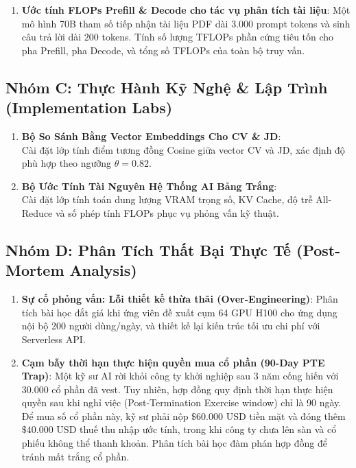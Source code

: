 \begin{enumerate}[label=\textbf{B\arabic*.}]
  \item \textbf{Ước tính FLOPs Prefill \& Decode cho tác vụ phân tích tài liệu}:
  Một mô hình 70B tham số tiếp nhận tài liệu PDF dài $3.000$ prompt tokens và sinh câu trả lời dài $200$ tokens.
  Tính số lượng TFLOPs phần cứng tiêu tốn cho pha Prefill, pha Decode, và tổng số TFLOPs của toàn bộ truy vấn.
\end{enumerate}

\subsection{Nhóm C: Thực Hành Kỹ Nghệ \& Lập Trình (Implementation Labs)}

\begin{enumerate}[label=\textbf{C\arabic*.}]
  \item \textbf{Bộ So Sánh Bằng Vector Embeddings Cho CV \& JD}: \\
  Cài đặt lớp  tính điểm tương đồng Cosine giữa vector CV và JD, xác định độ phù hợp theo ngưỡng $\theta = 0.82$.
  \item \textbf{Bộ Ước Tính Tài Nguyên Hệ Thống AI Bảng Trắng}: \\
  Cài đặt lớp  tính toán dung lượng VRAM trọng số, KV Cache, độ trễ All-Reduce và số phép tính FLOPs phục vụ phỏng vấn kỹ thuật.
\end{enumerate}

\subsection{Nhóm D: Phân Tích Thất Bại Thực Tế (Post-Mortem Analysis)}

\begin{enumerate}[label=\textbf{D\arabic*.}]
  \item \textbf{Sự cố phỏng vấn: Lỗi thiết kế thừa thãi (Over-Engineering)}:
  Phân tích bài học đắt giá khi ứng viên đề xuất cụm 64 GPU H100 cho ứng dụng nội bộ 200 người dùng/ngày, và thiết kế lại kiến trúc tối ưu chi phí với Serverless API.
  \item \textbf{Cạm bẫy thời hạn thực hiện quyền mua cổ phần (90-Day PTE Trap)}:
  Một kỹ sư AI rời khỏi công ty khởi nghiệp sau 3 năm cống hiến với $30.000$ cổ phần đã vest. Tuy nhiên, hợp đồng quy định thời hạn thực hiện quyền sau khi nghỉ việc (Post-Termination Exercise window) chỉ là 90 ngày. Để mua số cổ phần này, kỹ sư phải nộp $\$60.000\text{ USD}$ tiền mặt và đóng thêm $\$40.000\text{ USD}$ thuế thu nhập ước tính, trong khi công ty chưa lên sàn và cổ phiếu không thể thanh khoản. Phân tích bài học đàm phán hợp đồng để tránh mất trắng cổ phần.
\end{enumerate}

